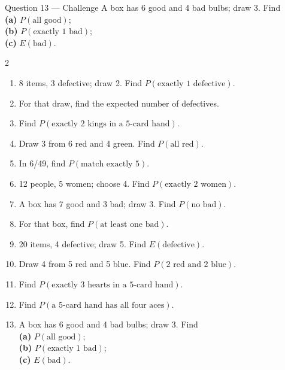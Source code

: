 \documentclass[11pt]{article}
\begin{document}
\begin{qbox}{Question 13 --- Challenge}
A box has 6 good and 4 bad bulbs; draw 3. Find \\ \textbf{(a)} $P(\text{all good})$; \\ \textbf{(b)} $P(\text{exactly 1 bad})$; \\ \textbf{(c)} $E(\text{bad})$.\workspace{3.4cm}
\end{qbox}

\clearpage
{}

\begin{recapbox}
\begin{multicols}{2}
\small
\begin{enumerate}[leftmargin=*,itemsep=3pt]
  \item 8 items, 3 defective; draw 2. Find $P(\text{exactly 1 defective})$.
  \item For that draw, find the expected number of defectives.
  \item Find $P(\text{exactly 2 kings in a 5-card hand})$.
  \item Draw 3 from 6 red and 4 green. Find $P(\text{all red})$.
  \item In 6/49, find $P(\text{match exactly 5})$.
  \item 12 people, 5 women; choose 4. Find $P(\text{exactly 2 women})$.
  \item A box has 7 good and 3 bad; draw 3. Find $P(\text{no bad})$.
  \item For that box, find $P(\text{at least one bad})$.
  \item 20 items, 4 defective; draw 5. Find $E(\text{defective})$.
  \item Draw 4 from 5 red and 5 blue. Find $P(\text{2 red and 2 blue})$.
  \item Find $P(\text{exactly 3 hearts in a 5-card hand})$.
  \item Find $P(\text{a 5-card hand has all four aces})$.
  \item A box has 6 good and 4 bad bulbs; draw 3. Find \\ \textbf{(a)} $P(\text{all good})$; \\ \textbf{(b)} $P(\text{exactly 1 bad})$; \\ \textbf{(c)} $E(\text{bad})$.
\end{enumerate}
\end{multicols}
\end{recapbox}
\end{document}

